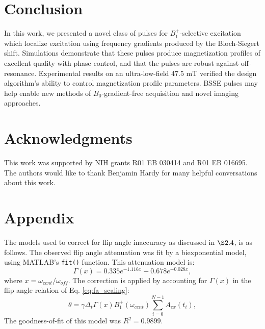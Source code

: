 \documentclass{article}
\begin{document}
\section*{Conclusion}
In this work, we presented a novel class of pulses for $B_1^+$-selective excitation which localize excitation using frequency gradients produced by the Bloch-Siegert shift. Simulations demonstrate that these pulses produce magnetization profiles of excellent quality with phase control, and that the pulses are robust against off-resonance. Experimental results on an ultra-low-field 47.5 mT verified the design algorithm's ability to control magnetization profile parameters. BSSE pulses may help enable new methods of $B_0$-gradient-free acquisition and novel imaging approaches. 

\section*{Acknowledgments}
This work was supported by NIH grants R01 EB 030414 and R01 EB 016695. The authors would like to thank Benjamin Hardy for many helpful conversations about this work.


\section*{Appendix}
The models used to correct for flip angle inaccuracy as discussed in $\S 2.4$, is as follows. The observed flip angle attenuation was fit by a biexponential model, using MATLAB's \texttt{fit()} function. 
This attenuation model is: 
\begin{equation*}
    \Gamma(x) = 0.335e^{-1.116x}+0.678e^{-0.028x},
\end{equation*}
where $x= \omega_{cent}/\omega_{off}$.
The correction is applied by accounting for $\Gamma(x)$ in the flip angle relation of Eq. \ref{eq:fa_scaling}:
\begin{equation*}
    \theta = \gamma \Delta_t \Gamma(x) B_1^+(\omega_{cent})  \sum_{i=0}^{N-1} A_{ex}(t_i),
\end{equation*}
The goodness-of-fit of this model was $R^2=0.9899$.
\end{document}
